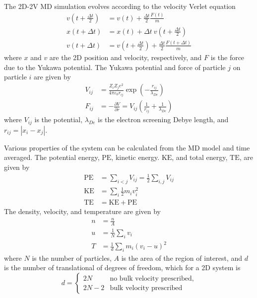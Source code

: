 \documentclass[11pt]{article}
\begin{document}
\paragraph{}
The 2D-2V MD simulation evolves according to the velocity Verlet equation
\begin{align*}
v(t+\frac{\Delta t}{2})  	&= v(t) + \frac{\Delta t}{2}\frac{F(t)}{m} \\
x(t+\Delta t) 		   		&= x(t) + \Delta t\:v(t+\frac{\Delta t}{2}) \\
v(t+\Delta t)			  	&= v(t+\frac{\Delta t}{2}) + 
								\frac{\Delta t}{2}\frac{F(t+\Delta t)}{m}
\end{align*}
where $x$ and $v$ are the 2D position and velocity, respectively, and $F$ is the force due to the Yukawa potential. The Yukawa potential and force of particle $j$ on particle $i$ are given by
\begin{align*}
V_{ij}	&= \frac{Z_i Z_j e^2}{4 \pi \varepsilon_0 r_{ij}}\exp\left(-\frac{r_{ij}}{\lambda_{De}}\right) \\
F_{ij}	&= -\frac{\partial V}{\partial r} = V_{ij}\left(\frac{1}{r_{ij}} + \frac{1}{\lambda_{De}}\right)
\end{align*}
where $V_{ij}$ is the potential, $\lambda_{De}$ is the electron screening Debye length, and $r_{ij} = |x_i - x_j|$.

Various properties of the system can be calculated from the MD model and time averaged. The potential energy, $\text{PE}$, kinetic energy. $\text{KE}$, and total energy, $\text{TE}$, are given by
\begin{align*}
\text{PE} &= \sum_{i<j}V_{ij} = \frac{1}{2}\sum_{i,j}V_{ij} \\
\text{KE}	&= \sum_{i}\frac{1}{2}m_iv_i^2 \\
\text{TE}		&= \text{KE} + \text{PE}
\end{align*}
The density, velocity, and temperature are given by
\begin{align*}
n &= \frac{n}{A} \\
u &= \frac{1}{N}\sum_{i}v_i \\
T &= \frac{1}{d}\sum_{i}m_i(v_i-u)^2
\end{align*}
where $N$ is the number of particles, $A$ is the area of the region of interest, and $d$ is the number of translational of degrees of freedom, which for a 2D system is
\begin{equation*}
d = \begin{cases}
	2N& 	\text{no bulk velocity prescribed}, \\
	2N-2&	\text{bulk velocity prescribed}
\end{cases}
\end{equation*}
\end{document}
